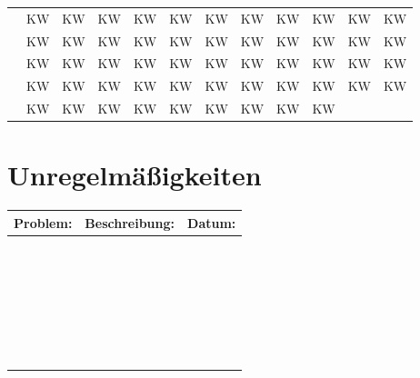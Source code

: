 \documentclass[landscape]{\basedir/fablab-document}
\newcommand{\head}{\bf \LARGE}
\newcounter{kw}
\newcommand{\kw}{KW\arabic{kw} \stepcounter{kw}}
\begin{document}
\begin{tabularx}{\textwidth}{|X||l|l|l|l|l|l|l|l|l|l|l|}
	\hline
	& \kw & \kw & \kw & \kw & \kw & \kw & \kw & \kw & \kw & \kw & \kw	\\ \cline{2-12}
	& \kw & \kw & \kw & \kw & \kw & \kw & \kw & \kw & \kw & \kw & \kw	\\ \cline{2-12}
	& \kw & \kw & \kw & \kw & \kw & \kw & \kw & \kw & \kw & \kw & \kw	\\ \cline{2-12}
	& \kw & \kw & \kw & \kw & \kw & \kw & \kw & \kw & \kw & \kw & \kw	\\ \cline{2-12}
	& \kw & \kw & \kw & \kw & \kw & \kw & \kw & \kw & \kw &		&		\\ \hline
\end{tabularx}

\pagebreak

\section*{Unregelmäßigkeiten}

\begin{tabularx}{\textwidth}{|l|X|r|}
	\hline
	\head Problem:	& \head Beschreibung:	& \head Datum:	\\ \hline \hline
					&						&				\\ \hline
					&						&				\\ \hline
					&						&				\\ \hline
					&						&				\\ \hline
					&						&				\\ \hline
					&						&				\\ \hline
					&						&				\\ \hline
					&						&				\\ \hline
					&						&				\\ \hline
					&						&				\\ \hline
					&						&				\\ \hline
					&						&				\\ \hline
					&						&				\\ \hline
					&						&				\\ \hline
					&						&				\\ \hline
					&						&				\\ \hline
					&						&				\\ \hline
					&						&				\\ \hline
					&						&				\\ \hline
					&						&				\\ \hline
					&						&				\\ \hline
					&						&				\\ \hline
					&						&				\\ \hline
					&						&				\\ \hline
					&						&				\\ \hline
					&						&				\\ \hline
					&						&				\\ \hline
					&						&				\\ \hline
\end{tabularx}
\end{document}
